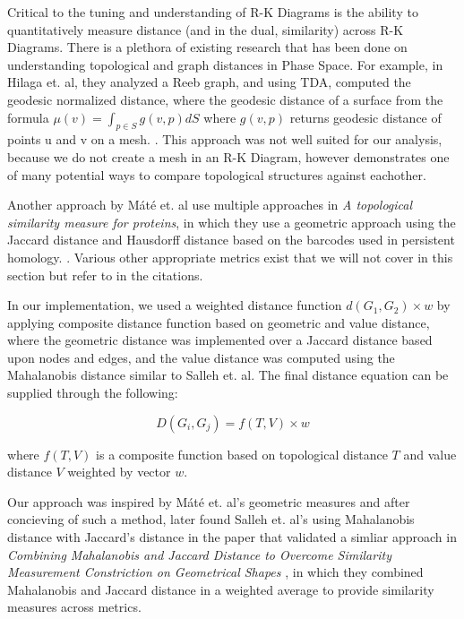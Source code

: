 Critical to the tuning and understanding of R-K Diagrams is the ability to quantitatively measure distance (and in the dual, similarity) across R-K Diagrams. There is a plethora of existing research that has been done on understanding topological and graph distances in Phase Space. For example, in Hilaga et. al, they analyzed a Reeb graph, and using TDA, computed the geodesic normalized distance, where the geodesic distance of a surface from the formula $\mu(v) = \int_{p \in S} g(v,p)dS$ where $g(v,p)$ returns geodesic distance of points u and v on a mesh. \cite{hilaga_shinagawa_kohmura_kunii}. This approach was not well suited for our analysis, because we do not create a mesh in an R-K Diagram, however demonstrates one of many potential ways to compare topological structures against eachother.

Another approach by Máté et. al use multiple approaches in \textit{A topological similarity measure for proteins}, in which they use a geometric approach using the Jaccard distance and Hausdorff distance based on the barcodes used in persistent homology. \cite{máté_hofmann_wenzel_heermann_2014}. Various other appropriate metrics exist that we will not cover in this section but refer to in the citations. \cite{mazandu_mulder_2012} \cite{reuter_2009}

In our implementation, we used a weighted distance function $d(G_{1}, G_{2})\times{w}$ by applying composite distance function based on geometric and value distance, where the geometric distance was implemented over a Jaccard distance based upon nodes and edges, and the value distance was computed using the Mahalanobis distance similar to Salleh et. al\cite{Salleh1_et_al}. The final distance equation can be supplied through the following:

\begin{equation}
D(G_{i},G_{j}) = f(T,V)\times{w}
\end{equation}

where $f(T,V)$ is a composite function based on topological distance $T$ and value distance $V$ weighted by vector $w$.

Our approach was inspired by Máté et. al's geometric measures and after concieving of such a method, later found Salleh et. al's using Mahalanobis distance with Jaccard's distance in the paper that validated a simliar approach in \textit{Combining Mahalanobis and Jaccard Distance to Overcome Similarity Measurement Constriction on Geometrical Shapes} \cite{Salleh1_et_al}, in which they combined Mahalanobis and Jaccard distance in a weighted average to provide similarity measures across metrics.

